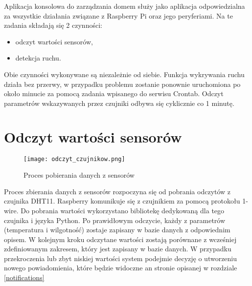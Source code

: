 Aplikacja konsolowa do zarządzania domem służy jako aplikacja odpowiedzialna za wszystkie działania związane z Raspberry Pi oraz jego peryferiami. Na te zadania składają się 2 czynności:
\begin{itemize}
\item odczyt wartości sensorów,
\item detekcja ruchu.
\end{itemize}
Obie czynności wykonywane są niezależnie od siebie. Funkcja wykrywania ruchu działa bez przerwy, w przypadku problemu zostanie ponownie uruchomiona po około minucie za pomocą zadania wpisanego do serwisu Crontab. Odczyt parametrów wskazywanych przez czujniki odbywa się cyklicznie co 1 minutę.

\section{Odczyt wartości sensorów}
\begin{figure}[H]
	\centering
	\texttt{[image: odczyt\_czujnikow.png]}
	\caption{Proces pobierania danych z sensorów}
	\label{fig:odczyt_sensorow}
\end{figure}
Proces zbierania danych z sensorów rozpoczyna się od pobrania odczytów z czujnika DHT11. Raspberry komunikuje się z czujnikiem za pomocą protokołu 1-wire. Do pobrania wartości wykorzystano bibliotekę dedykowaną dla tego czujnika i języka Python. Po prawidłowym odczycie, każdy z parametrów (temperatura i wilgotność) zostaje zapisany w bazie danych z odpowiednim opisem. W kolejnym kroku odczytane wartości zostają porównane z wcześniej zdefiniowanym zakresem, który jest zapisany w bazie danych. W przypadku przekroczenia lub zbyt niskiej wartości system podejmie decyzję o utworzeniu nowego powiadomienia, które będzie widoczne an stronie opisanej w rozdziale \ref{notifications}

